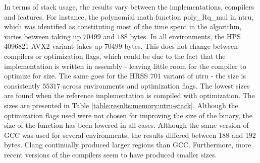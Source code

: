 In terms of stack usage, the results vary between the implementations, compilers and features. For instance, the polynomial math function poly\_Rq\_mul in \gls{ntru}, which was identified as constituting most of the time spent in the algorithm, varies between taking up $70499$ and $188$ bytes. In all environments, the HPS 4096821 AVX2 variant takes up $70499$ bytes. This does not change between compilers or optimization flags, which could be due to the fact that the implementation is written in assembly - leaving little room for the compiler to optimize for size. The same goes for the HRSS 701 variant of \gls{ntru} - the size is consistently $55317$ across environments and optimization flags. The lowest sizes are found when the reference implementation is compiled with optimization. The sizes are presented in Table \ref{table:results:memory:ntru-stack}. Although the optimization flags used were not chosen for improving the size of the binary, the size of the function has been lowered in all cases. Although the same version of GCC was used for several environments, the results differed between $188$ and $192$ bytes. Clang continually produced larger regions than GCC. Furthermore, more recent versions of the compilers seem to have produced smaller sizes.

